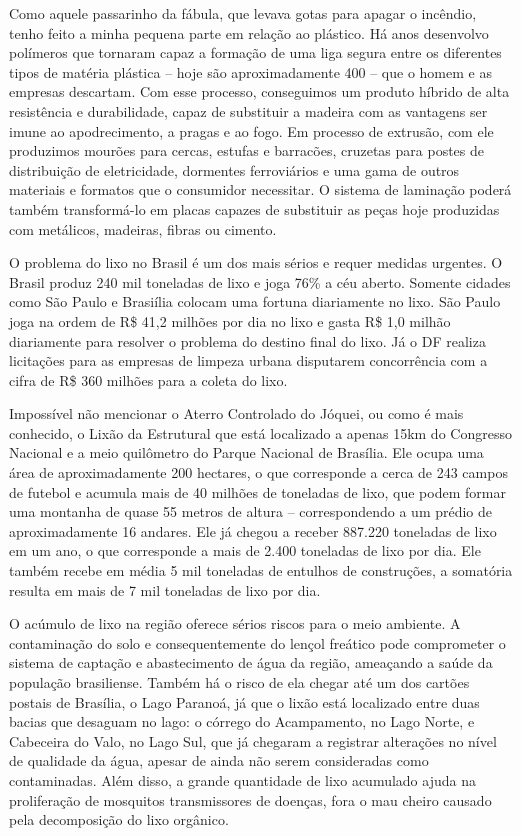 Como aquele passarinho da fábula, que levava gotas para apagar o incêndio, tenho feito a minha pequena parte em relação ao plástico. Há anos desenvolvo polímeros que tornaram capaz a formação de uma liga segura entre os diferentes tipos de matéria plástica – hoje são aproximadamente 400 – que o homem e as empresas descartam. Com esse processo, conseguimos um produto híbrido de alta resistência e durabilidade, capaz de substituir a madeira com as vantagens ser imune ao apodrecimento, a pragas e ao fogo. Em processo de extrusão, com ele produzimos mourões para cercas, estufas e barracões, cruzetas para postes de distribuição de eletricidade, dormentes ferroviários e uma gama de outros materiais e formatos que o consumidor necessitar. O sistema de laminação poderá também transformá-lo em placas capazes de substituir as peças hoje produzidas com metálicos, madeiras, fibras ou cimento.

O problema do lixo no Brasil é um dos mais sérios e requer medidas urgentes. O Brasil produz 240 mil toneladas de lixo e joga 76\% a céu aberto. Somente cidades como São Paulo e Brasiília colocam uma fortuna diariamente no lixo. São Paulo joga na ordem de R\$ 41,2 milhões por dia no lixo e gasta R\$ 1,0 milhão diariamente para resolver o problema do destino final do lixo. Já o DF realiza licitações para as empresas de limpeza urbana disputarem concorrência com a cifra de R\$ 360 milhões para a coleta do lixo.

Impossível não mencionar o Aterro Controlado do Jóquei, ou como é mais conhecido, o Lixão da Estrutural que está localizado a apenas 15km do Congresso Nacional e a meio quilômetro do Parque Nacional de Brasília. Ele ocupa uma área de aproximadamente 200 hectares, o que corresponde a cerca de 243 campos de futebol e acumula mais de 40 milhões de toneladas de lixo, que podem formar uma montanha de quase 55 metros de altura – correspondendo a um prédio de aproximadamente 16 andares. Ele já chegou a receber 887.220 toneladas de lixo em um ano, o que corresponde a mais de 2.400 toneladas de lixo por dia. Ele também recebe em média 5 mil toneladas de entulhos de construções, a somatória resulta em mais de 7 mil toneladas de lixo por dia.

O acúmulo de lixo na região oferece sérios riscos para o meio ambiente. A contaminação do solo e consequentemente do lençol freático pode comprometer o sistema de captação e abastecimento de água da região, ameaçando a saúde da população brasiliense. Também há o risco de ela chegar até um dos cartões postais de Brasília, o Lago Paranoá, já que o lixão está localizado entre duas bacias que desaguam no lago: o córrego do Acampamento, no Lago Norte, e Cabeceira do Valo, no Lago Sul, que já chegaram a registrar alterações no nível de qualidade da água, apesar de ainda não serem consideradas como contaminadas. Além disso, a grande quantidade de lixo acumulado ajuda na proliferação de mosquitos transmissores de doenças, fora o mau cheiro causado pela decomposição do lixo orgânico.

